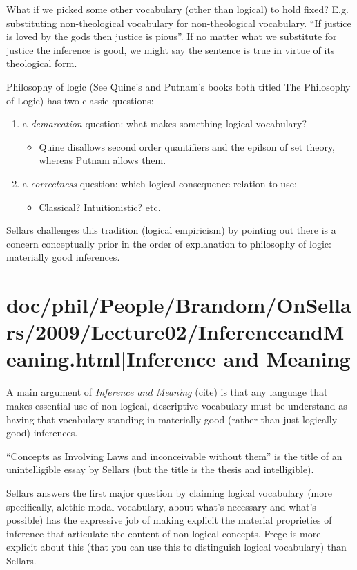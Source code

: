 \documentclass[12pt,a4paper]{report}
\begin{document}
What if we picked some other vocabulary (other than logical) to hold fixed? E.g.
substituting non-theological vocabulary for non-theological vocabulary.
``If justice is loved by the gods then justice is pious''. If no matter what we
substitute for justice the inference is good, we might say the sentence is true
in virtue of its theological form.

Philosophy of logic (See Quine's and Putnam's books both titled The Philosophy
of Logic) has two classic questions:
\begin{enumerate}
    \item a \emph{demarcation} question: what makes something logical vocabulary?
     \begin{itemize}
        \item Quine disallows second order quantifiers and the epilson of set
              theory, whereas Putnam allows them.
     \end{itemize}
    \item a \emph{correctness} question: which logical consequence relation to use:
      \begin{itemize}
      \item Classical? Intuitionistic? etc.
      \end{itemize}
\end{enumerate}

Sellars challenges this tradition (logical empiricism) by pointing out there is
a concern conceptually prior in the order of explanation to philosophy of
logic: materially good inferences.

\part{doc/phil/People/Brandom/OnSellars/2009/Lecture02/InferenceandMeaning.html|Inference and Meaning}

A main argument of \textit{Inference and Meaning} (cite) is that any language that makes essential use of non-logical, descriptive vocabulary must be understand as having that vocabulary standing in materially good (rather than just logically good) inferences.

``Concepts as Involving Laws and inconceivable without them'' is the title of an unintelligible essay by Sellars (but the title is the thesis and intelligible).

Sellars answers the first major question by claiming logical vocabulary (more specifically, alethic modal vocabulary, about what's necessary and what's possible) has the expressive job of making explicit the material proprieties of inference that articulate the content of non-logical concepts. Frege is more explicit about this (that you can use this to distinguish logical vocabulary) than Sellars.
\end{document}
